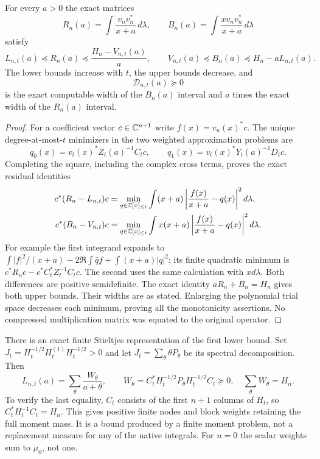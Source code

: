 \begin{mmnativetheorem}
\label{mmnative:thm:finite}
For every $a>0$ the exact matrices
\[
 R_n(a)=\int\frac{v_nv_n^*}{x+a}\,d\lambda,
 \qquad B_n(a)=\int\frac{xv_nv_n^*}{x+a}\,d\lambda
\]
satisfy
\begin{equation}\label{mmnative:eq:bounds}
 \boxed{L_{n,t}(a)\preceq R_n(a)
       \preceq\frac{H_n-V_{n,t}(a)}a,\qquad
 V_{n,t}(a)\preceq B_n(a)\preceq H_n-aL_{n,t}(a).}
\end{equation}
The lower bounds increase with $t$, the upper bounds decrease, and
\begin{equation}\label{mmnative:eq:gap}
 \mathcal D_{n,t}(a)\succeq0
\end{equation}
is the exact computable width of the $B_n(a)$ interval and $a$ times
the exact width of the $R_n(a)$ interval.
\end{mmnativetheorem}
\begin{proof}
For a coefficient vector $c\in\mathbb C^{n+1}$ write
$f(x)=v_n(x)^*c$.  The unique degree-at-most-$t$ minimizers in the
two weighted approximation problems are
\[
 q_0(x)=v_t(x)^*Z_t(a)^{-1}C_tc,
 \qquad q_1(x)=v_t(x)^*Y_t(a)^{-1}D_tc.
\]
Completing the square, including the complex cross terms, proves
the exact residual identities
\begin{align}
 c^*(R_n-L_{n,t})c
 &=\min_{q\in\mathbb C[x]_{\le t}}
   \int(x+a)\left|\frac{f(x)}{x+a}-q(x)\right|^2d\lambda,
 \label{mmnative:eq:residual0}\\
 c^*(B_n-V_{n,t})c
 &=\min_{q\in\mathbb C[x]_{\le t}}
   \int x(x+a)\left|\frac{f(x)}{x+a}-q(x)\right|^2d\lambda.
 \label{mmnative:eq:residual1}
\end{align}
For example the first integrand expands to
$\int|f|^2/(x+a)-2\Re\int\bar qf+\int(x+a)|q|^2$;
its finite quadratic minimum is $c^*R_nc-c^*C_t^*Z_t^{-1}C_tc$.
The second uses the same calculation with $xd\lambda$.
Both differences are positive semidefinite.  The exact identity
$aR_n+B_n=H_n$ gives both upper bounds.  Their widths are as stated.
Enlarging the polynomial trial space decreases each minimum, proving
all the monotonicity assertions.  No compressed multiplication matrix
was equated to the original operator.
\end{proof}

There is an exact finite Stieltjes representation of the first lower
bound.  Set $J_t=H_t^{-1/2}H_t^{(1)}H_t^{-1/2}>0$ and let
$J_t=\sum_\theta\theta P_\theta$ be its spectral decomposition.  Then
\begin{equation}\label{mmnative:eq:blockstieltjes}
 L_{n,t}(a)=\sum_\theta\frac{W_\theta}{a+\theta},\qquad
 W_\theta=C_t^*H_t^{-1/2}P_\theta H_t^{-1/2}C_t\succeq0,
 \quad\sum_\theta W_\theta=H_n.
\end{equation}
To verify the last equality, $C_t$ consists of the first $n+1$
columns of $H_t$, so $C_t^*H_t^{-1}C_t=H_n$.  This gives positive
finite nodes and block weights retaining the full moment mass.  It is
a bound produced by a finite moment problem, not a replacement measure
for any of the native integrals.  For $n=0$ the scalar weights sum to
$\mu_0$, not one.

